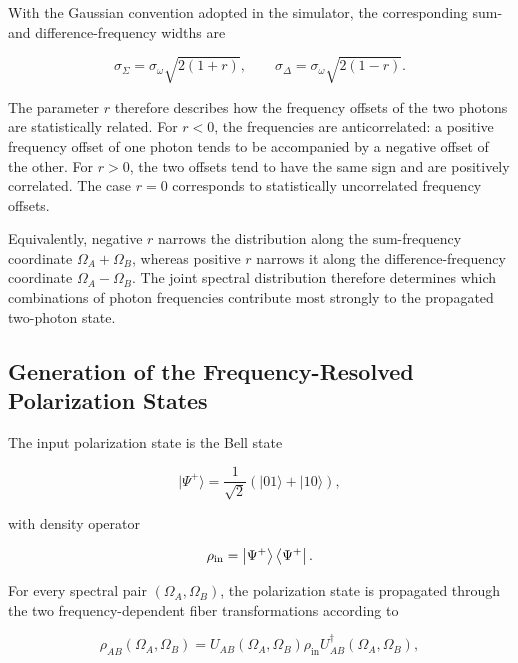With the Gaussian convention adopted in the simulator, the corresponding
sum- and difference-frequency widths are

\begin{equation}
\sigma_{\Sigma}
=
\sigma_\omega
\sqrt{2(1+r)},
\qquad
\sigma_{\Delta}
=
\sigma_\omega
\sqrt{2(1-r)}.
\label{eq:exp3_joint_spectral_widths}
\end{equation}

The parameter \(r\) therefore describes how the frequency offsets of the two
photons are statistically related. For \(r<0\), the frequencies are
anticorrelated: a positive frequency offset of one photon tends to be accompanied
by a negative offset of the other. For \(r>0\), the two offsets tend to have the
same sign and are positively correlated. The case \(r=0\) corresponds to
statistically uncorrelated frequency offsets.

Equivalently, negative \(r\) narrows the distribution along the
sum-frequency coordinate \(\Omega_A+\Omega_B\), whereas positive \(r\) narrows
it along the difference-frequency coordinate \(\Omega_A-\Omega_B\). The joint
spectral distribution therefore determines which combinations of photon
frequencies contribute most strongly to the propagated two-photon state.



\subsection{Generation of the Frequency-Resolved Polarization States}

The input polarization state is the Bell state

\begin{equation}
|\Psi^{+}\rangle
=
\frac{1}{\sqrt{2}}
\left(
|01\rangle+|10\rangle
\right),
\nonumber
\end{equation}

with density operator

\begin{equation}
\rho_{\mathrm{in}}
=
\left|\Psi^+\right\rangle
\left\langle\Psi^+\right|.
\nonumber
\end{equation}

For every spectral pair
\((\Omega_A,\Omega_B)\), the polarization state is propagated through the two
frequency-dependent fiber transformations according to

\begin{equation}
\rho_{AB}(\Omega_A,\Omega_B)
=
U_{AB}(\Omega_A,\Omega_B)
\rho_{\mathrm{in}}
U_{AB}^{\dagger}(\Omega_A,\Omega_B),
\label{eq:exp3_frequency_resolved_state}
\end{equation}

